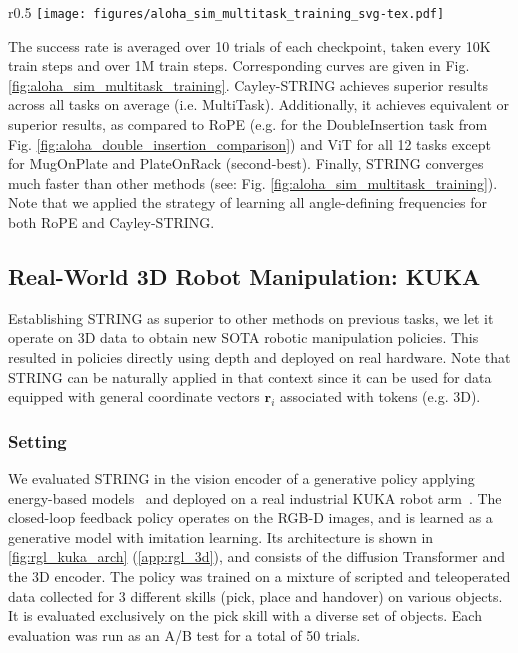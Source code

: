 \begin{wrapfigure}{r}{0.5\textwidth}
\vspace{-7mm}
\centering
\texttt{[image: figures/aloha\_sim\_multitask\_training\_svg-tex.pdf]}
\vspace{-4mm}
\label{fig:aloha_sim_multitask_training}
\vspace{-5mm}
\end{wrapfigure}
The success rate is averaged over 10 trials of each checkpoint, taken every 10K train steps and over 1M train steps.
Corresponding curves are given in Fig. \ref{fig:aloha_sim_multitask_training}.
Cayley-STRING achieves superior results across all tasks on average (i.e. MultiTask).
Additionally, it achieves equivalent or superior results, as compared to RoPE (e.g. for the \textrm{DoubleInsertion} task from Fig. \ref{fig:aloha_double_insertion_comparison}) and ViT for all 12 tasks except for \textrm{MugOnPlate} and \textrm{PlateOnRack} (second-best).
Finally, STRING converges much faster than other methods (see: Fig. \ref{fig:aloha_sim_multitask_training}).
Note that we applied the strategy of learning all angle-defining frequencies for both RoPE and Cayley-STRING.









\subsection{Real-World 3D Robot Manipulation: KUKA}
\label{sec:rgl_section}

Establishing STRING as superior to other methods on previous tasks, we let it operate on 3D data to obtain new SOTA robotic manipulation policies. This resulted in policies directly using depth and deployed on real hardware. Note that STRING can be naturally applied in that context since it can be used for data equipped with general coordinate vectors $\mathbf{r}_{i}$ associated with tokens (e.g. 3D). 
\vspace{-2mm}
\subsubsection{Setting}
\label{sec:rgl_setting}
We evaluated STRING in the vision encoder of a generative policy applying energy-based models~\citep{singh2024revisiting} and deployed on a real industrial KUKA robot arm~\citep{JADYK23}. The closed-loop feedback policy operates on the RGB-D images, and is learned as a generative model with imitation learning. Its architecture is shown in \cref{fig:rgl_kuka_arch} (\cref{app:rgl_3d}), and consists of the diffusion Transformer and the 3D encoder. The policy was trained on a mixture of scripted and teleoperated data collected for 3 different skills (\textrm{pick}, \textrm{place} and \textrm{handover}) on various objects. 
It is evaluated exclusively on the pick skill with a diverse set of objects. Each evaluation was run as an A/B test for a total of 50 trials. \vspace{-2mm}
